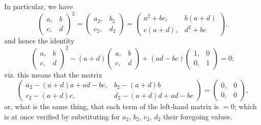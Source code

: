 \documentclass[12pt,a4paper]{article}
\begin{document}
In particular, we have
%
\[
\left(\begin{array}{c|c} a, & b \\ \hline c, & d \end{array}\right)^{\!2}
= \left(\begin{array}{c|c} a_2, & b_2 \\ \hline c_2, & d_2 \end{array}\right)
= \left(\begin{array}{c|c} a^2+bc, & b(a+d) \\ \hline c(a+d), & d^2+bc \end{array}\right),
\]
%
and hence the identity
%
\[
\left(\begin{array}{c|c} a, & b \\ \hline c, & d \end{array}\right)^{\!2}
- (a+d) \left(\begin{array}{c|c} a, & b \\ \hline c, & d \end{array}\right)
+ (ad-bc) \left(\begin{array}{c|c} 1, & 0 \\ \hline 0, & 1 \end{array}\right) = 0;
\]
%
viz. this means that the matrix
%
\[
\left(\begin{array}{c|c}
a_2 - (a+d)a + ad-bc, & b_2 - (a+d)b \\[4pt]
c_2 - (a+d)c, & d_2 - (a+d)d + ad-bc
\end{array}\right)
= \left(\begin{array}{c|c} 0, & 0 \\ \hline 0, & 0 \end{array}\right),
\]
%
or, what is the same thing, that each term of the left-hand matrix is $=0$; which is
at once verified by substituting for $a_2$, $b_2$, $c_2$, $d_2$ their foregoing values.
\end{document}
